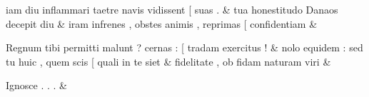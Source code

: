 \documentclass[12pt,onecolumn,twoside,a4paper]{memoir}
\begin{document}
\begin{pairs}
\begin{Leftside}
                              iam
                              diu
                              inflammari
                              taetre
                              navis
                              vidissent
                              [
                              suas
                              . \&
                         \stanza {}
                     tua
                              honestitudo
                              Danaos
                              decepit
                              diu \&
                         \stanza {}
                     iram
                              infrenes
                              ,
                              obstes
                              animis
                              ,
                              reprimas
                              [
                              confidentiam \&
                         \stanza {}
                     
                              Regnum
                              tibi
                              permitti
                              malunt
                              ?
                              cernas
                              :
                              [
                              tradam
                              exercitus
                              ! \&
                         \stanza {}nolo
                              equidem
                              :
                              sed
                              tu
                              huic
                              ,
                              quem
                              scis
                              [
                              quali
                              in
                              te
                              siet & fidelitate
                              ,
                              ob
                              fidam
                              naturam
                              viri & 
                     
                              Ignosce
                              .
                              .
                              . \&


\end{Leftside}
\end{pairs}
\end{document}
